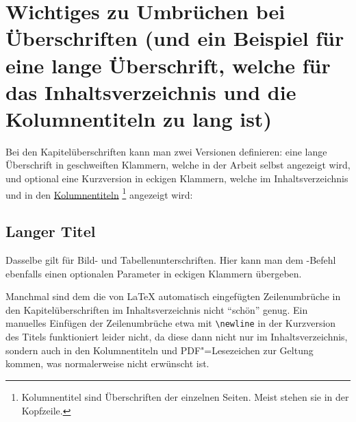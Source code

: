 \section[%
         Wichtiges zu Umbrüchen bei Überschriften
         \mbox{(Kurzversion für das Inhaltsverzeichnis etc.)}%
				]{%
         Wichtiges zu Umbrüchen bei Überschriften
         (und ein Beispiel \newline für eine lange Überschrift,
         welche \newline für das Inhaltsverzeichnis und 
         \newline die Kolumnentiteln zu lang ist)%
				}%
%
\label{chap:Titles}
%
%
Bei den Kapitelüberschriften kann man zwei Versionen definieren:
eine lange Überschrift in geschweiften Klammern, welche in der Arbeit selbst angezeigt wird, 
und optional eine Kurzversion in eckigen Klammern, welche im Inhaltsverzeichnis und in den 
\href{https://de.wikipedia.org/wiki/Kolumnentitel}{Kolumnentiteln}%
\footnote{Kolumnentitel sind Überschriften der einzelnen Seiten. Meist stehen sie in der Kopfzeile.}
angezeigt wird:
\begin{latex}
\section[Kurzversion]{Langer Titel}
\end{latex}
Dasselbe gilt für Bild- und Tabellenunterschriften. Hier kann man dem
-Befehl ebenfalls einen optionalen Parameter in eckigen Klammern übergeben.

Manchmal sind dem  die von \LaTeX{} automatisch eingefügten Zeilenumbrüche in den Kapitelüberschriften im Inhaltsverzeichnis nicht \enquote{schön} genug.
Ein manuelles Einfügen der Zeilenumbrüche etwa mit \verb+\newline+ in der Kurzversion des Titels funktioniert leider nicht,
da diese dann nicht nur im Inhaltsverzeichnis, sondern auch in den Kolumnentiteln und PDF"=Lesezeichen zur Geltung kommen, 
was normalerweise nicht erwünscht ist.

